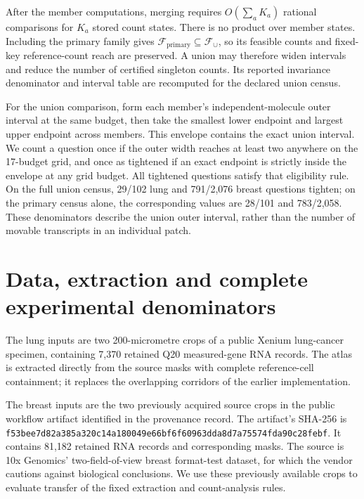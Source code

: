 \documentclass[10pt,letterpaper]{article}
\begin{document}
After the member computations, merging requires $O(\sum_a K_a)$ rational comparisons for $K_a$ stored count states. There is no product over member states. Including the primary family gives $\mathcal F_{\mathrm{primary}}\subseteq\mathcal F_\cup$, so its feasible counts and fixed-key reference-count reach are preserved. A union may therefore widen intervals and reduce the number of certified singleton counts. Its reported invariance denominator and interval table are recomputed for the declared union census.

For the union comparison, form each member's independent-molecule outer interval at the same budget, then take the smallest lower endpoint and largest upper endpoint across members. This envelope contains the exact union interval. We count a question once if the outer width reaches at least two anywhere on the 17-budget grid, and once as tightened if an exact endpoint is strictly inside the envelope at any grid budget. All tightened questions satisfy that eligibility rule. On the full union census, 29/102 lung and 791/2,076 breast questions tighten; on the primary census alone, the corresponding values are 28/101 and 783/2,058. These denominators describe the union outer interval, rather than the number of movable transcripts in an individual patch.

\section{Data, extraction and complete experimental denominators}
The lung inputs are two 200-micrometre crops of a public Xenium lung-cancer specimen, containing 7,370 retained Q20 measured-gene RNA records. The atlas is extracted directly from the source masks with complete reference-cell containment; it replaces the overlapping corridors of the earlier implementation.

The breast inputs are the two previously acquired source crops in the public workflow artifact identified in the provenance record. The artifact's SHA-256 is \nolinkurl{f53bee7d82a385a320c14a180049e66bf6f60963dda8d7a75574fda90c28febf}. It contains 81,182 retained RNA records and corresponding masks. The source is 10x Genomics' two-field-of-view breast format-test dataset, for which the vendor cautions against biological conclusions. We use these previously available crops to evaluate transfer of the fixed extraction and count-analysis rules.
\end{document}
